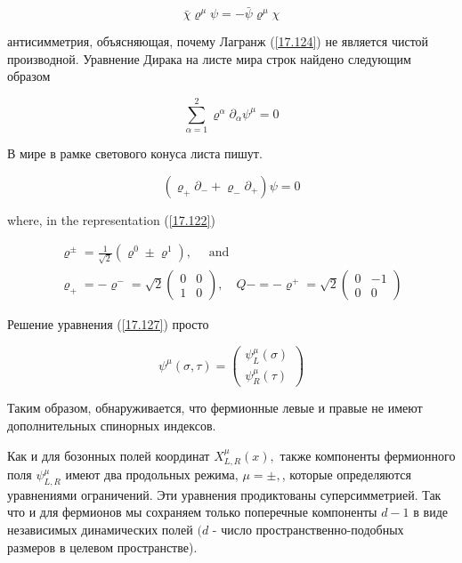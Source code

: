 \documentclass[main.tex]{subfiles}
\begin{document}
\begin{equation}\label{17.126}
\bar{\chi} \varrho^{\mu} \psi=-\bar{\psi} \varrho^{\mu} \chi
\end{equation}

антисимметрия, объясняющая, почему Лагранж (\ref{17.124}) не является чистой производной. Уравнение Дирака на листе мира строк найдено следующим образом

\begin{equation}\label{17.127}
\sum_{\alpha=1}^{2} \varrho^{\alpha} \partial_{\alpha} \psi^{\mu}=0
\end{equation}

В мире в рамке светового конуса листа пишут.

\begin{equation}\label{17.128}
\left(\varrho_{+} \partial_{-}+\varrho_{-} \partial_{+}\right) \psi=0
\end{equation}

where, in the representation (\ref{17.122})

\begin{equation}\label{17.130}
\begin{array}{l}
{\varrho^{\pm}=\frac{1}{\sqrt{2}}\left(\varrho^{0} \pm \varrho^{1}\right), \quad \text { and }} \\
{\varrho_{+}=-\varrho^{-}=\sqrt{2}\left(\begin{array}{cc}
{0} & {0} \\
{1} & {0}
\end{array}\right), \quad Q-=-\varrho^{+}=\sqrt{2}\left(\begin{array}{cc}
{0} & {-1} \\
{0} & {0}
\end{array}\right)}
\end{array}
\end{equation}

Решение уравнения (\ref{17.127}) просто

\begin{equation}\label{17.131}
\psi^{\mu}(\sigma, \tau)=\left(\begin{array}{c}
{\psi_{L}^{\mu}(\sigma)} \\
{\psi_{R}^{\mu}(\tau)}
\end{array}\right)
\end{equation}

Таким образом, обнаруживается, что фермионные левые и правые не имеют дополнительных спинорных индексов.

Как и для бозонных полей координат $X_{L, R}^{\mu}(x),$ также компоненты фермионного поля $\psi_{L, R}^{\mu}$ имеют два продольных режима, $\mu=\pm,$, которые определяются уравнениями ограничений. Эти уравнения продиктованы суперсимметрией. Так что и для фермионов мы сохраняем только поперечные компоненты $d-1$ в виде независимых динамических полей $(d$ - число пространственно-подобных размеров в целевом пространстве).
\end{document}
